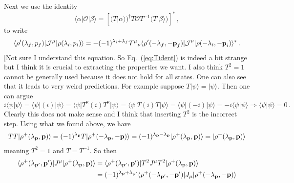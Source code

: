 {Next we use the identity
\begin{equation}
\label{eq:Tident}
  \langle \alpha \vert  \mathcal O \vert \beta \rangle    =  \left [ \Big ( T \vert \alpha \rangle \Big )^\dagger   T \mathcal O T^{-1}  \Big ( T \vert \beta \rangle \Big ) \right ]^* \,,
\end{equation}
to write
\begin{equation}
\langle\rho'(\lambda_f,p_f)|{\mathcal{J}}^{\mu}|\rho(\lambda_i,p_i)\rangle =- (-1)^{\lambda_i+\lambda_f}  \mathcal {T^{\mu}}_\nu \langle\rho'(- \lambda_f, - \textbf p_f)|{\mathcal{J}}^{\nu}|\rho(- \lambda_i, - \textbf p_i)\rangle^*  \,.
\end{equation}
{\raul [Not sure I understand this equation. {\mh So Eq.~(\ref{eq:Tident}) is indeed a bit strange but I think it is crucial to extracting the properties we want. I also think $T^2=1$ cannot be generally used because it does not hold for all states. One can also see that it leads to very weird predictions. For example suppose $T \vert \psi \rangle = \vert \psi \rangle$. Then one can argue
\begin{equation}
i \langle \psi \vert \psi \rangle =  \langle \psi \vert (i) \vert \psi \rangle =  \langle \psi \vert  T^2 (i) T^2 \vert \psi \rangle =  \langle \psi \vert  T (i) T \vert \psi \rangle =  \langle \psi \vert  (-i)  \vert \psi \rangle = - i  \langle \psi \vert \psi \rangle \Longrightarrow  \langle \psi \vert \psi \rangle = 0\,.
\end{equation}
Clearly this does not make sense and I think that inserting $T^2$ is the incorrect step.
} Using what we found above, we have
\begin{align}
 T T \vert \rho^+(\lambda_{\textbf{p}}, \textbf p) \rangle = (-1)^{\lambda_{\textbf{p}}}T \vert \rho^+(- \lambda_{\textbf{p}} ,- \textbf p) \rangle
 =
(-1)^{\lambda_{\textbf{p}}-\lambda_{\textbf{p}}} \vert \rho^+( \lambda_{\textbf{p}} , \textbf p) \rangle
= 
\vert \rho^+( \lambda_{\textbf{p}} , \textbf p) \rangle
\end{align}
meaning $T^2=1$ and $T=T^{-1}$. So then 
\begin{align}
  \langle \rho^+(\lambda_{\textbf{p}'}, \textbf p') \vert  \mathcal \mathcal{J}^{\mu} \vert \rho^+(\lambda_{\textbf{p}}, \textbf p) \rangle   
  & = 
  \langle \rho^+(\lambda_{\textbf{p}'}, \textbf p') \vert  T^2\mathcal \mathcal{J}^{\mu} T^2\vert \rho^+(\lambda_{\textbf{p}}, \textbf p) \rangle 
 \nn\\&
 =
 (-1)^{\lambda_{\textbf{p}}+\lambda_{\textbf{p}'}}
  \langle \rho^+(-\lambda_{\textbf{p}'}, -\textbf p') \vert  \mathcal \mathcal{J}_{\mu} \vert \rho^+(-\lambda_{\textbf{p}}, -\textbf p) \rangle 

\end{align}}}

